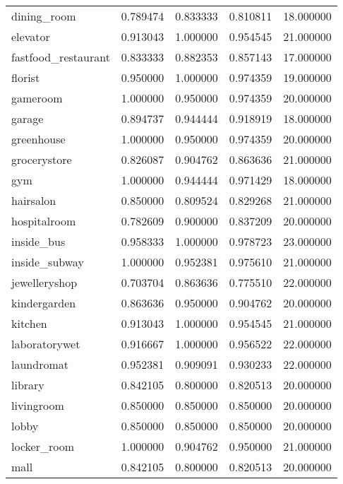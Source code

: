 \begin{tabular}{lrrrr}
dining\_room         &   0.789474 &  0.833333 &  0.810811 &    18.000000 \\
elevator            &   0.913043 &  1.000000 &  0.954545 &    21.000000 \\
fastfood\_restaurant &   0.833333 &  0.882353 &  0.857143 &    17.000000 \\
florist             &   0.950000 &  1.000000 &  0.974359 &    19.000000 \\
gameroom            &   1.000000 &  0.950000 &  0.974359 &    20.000000 \\
garage              &   0.894737 &  0.944444 &  0.918919 &    18.000000 \\
greenhouse          &   1.000000 &  0.950000 &  0.974359 &    20.000000 \\
grocerystore        &   0.826087 &  0.904762 &  0.863636 &    21.000000 \\
gym                 &   1.000000 &  0.944444 &  0.971429 &    18.000000 \\
hairsalon           &   0.850000 &  0.809524 &  0.829268 &    21.000000 \\
hospitalroom        &   0.782609 &  0.900000 &  0.837209 &    20.000000 \\
inside\_bus          &   0.958333 &  1.000000 &  0.978723 &    23.000000 \\
inside\_subway       &   1.000000 &  0.952381 &  0.975610 &    21.000000 \\
jewelleryshop       &   0.703704 &  0.863636 &  0.775510 &    22.000000 \\
kindergarden        &   0.863636 &  0.950000 &  0.904762 &    20.000000 \\
kitchen             &   0.913043 &  1.000000 &  0.954545 &    21.000000 \\
laboratorywet       &   0.916667 &  1.000000 &  0.956522 &    22.000000 \\
laundromat          &   0.952381 &  0.909091 &  0.930233 &    22.000000 \\
library             &   0.842105 &  0.800000 &  0.820513 &    20.000000 \\
livingroom          &   0.850000 &  0.850000 &  0.850000 &    20.000000 \\
lobby               &   0.850000 &  0.850000 &  0.850000 &    20.000000 \\
locker\_room         &   1.000000 &  0.904762 &  0.950000 &    21.000000 \\
mall                &   0.842105 &  0.800000 &  0.820513 &    20.000000 \\

\end{tabular}
